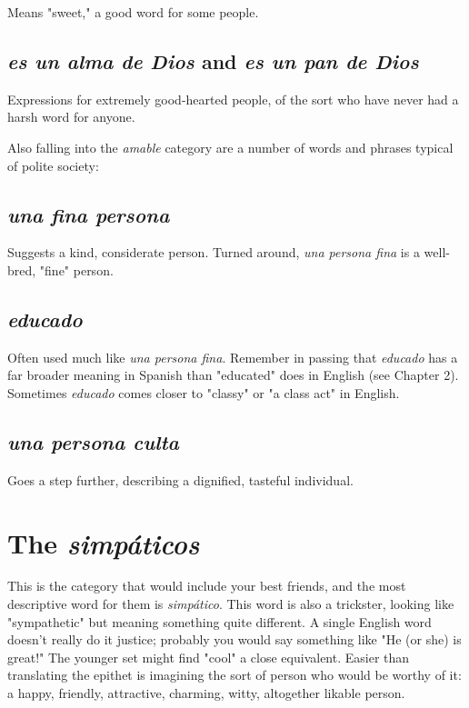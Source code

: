 \documentclass[14pt,a4paper,oneside]{memoir}
\newcommand{\bsk}{\vspace{20pt}}
\begin{document}
Means "sweet," a good word for some people.

\subsection{\emph{es un alma de Dios} and \emph{es un pan de Dios}}

Expressions
for extremely good-hearted people, of the sort who have never had a
harsh word for anyone.

\bsk

Also falling into the \emph{amable} category are a number of words
and phrases typical of polite society:

\subsection{\emph{una fina persona}}

Suggests a kind, considerate person.
Turned around, \emph{una persona fina} is a well-bred, "fine" person.

\subsection{\emph{educado}}

Often used much like \emph{una persona fina}. Remember in passing that \emph{educado} has a far broader meaning in Spanish than
"educated" does in English (see Chapter 2). Sometimes \emph{educado} comes
closer to "classy" or "a class act" in English.

\subsection{\emph{una persona culta}}

Goes a step further, describing a dignified, tasteful individual.

\section{The \emph{simpáticos}}

This is the category that would include your best friends, and
the most descriptive word for them is \emph{simpático}. This word is also a
trickster, looking like "sympathetic" but meaning something quite different. A single English word doesn't really do it justice; probably you
would say something like "He (or she) is great!" The younger set might
find "cool" a close equivalent. Easier than translating the epithet is
imagining the sort of person who would be worthy of it: a happy,
friendly, attractive, charming, witty, altogether likable person.
\end{document}

